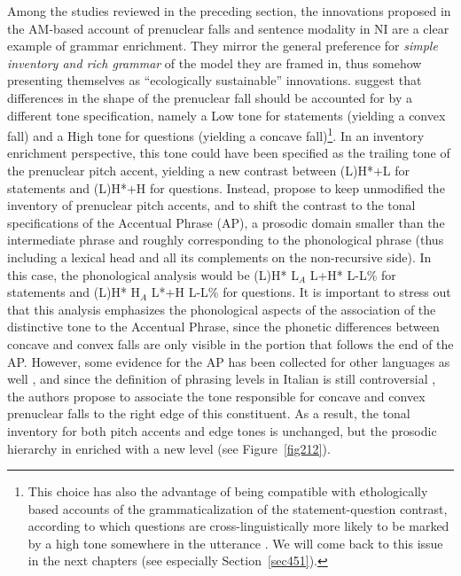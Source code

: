 Among the studies reviewed in the preceding section, the innovations proposed in the AM-based account of prenuclear falls and sentence modality in NI \citep{petrone2008tonal} are a clear example of grammar enrichment. They mirror the general preference for \textit{simple inventory and rich grammar} of the model they are framed in, thus somehow presenting themselves as ``ecologically sustainable'' innovations. \citeauthor{petrone2008tonal} suggest that differences in the shape of the prenuclear fall should be accounted for by a different tone specification, namely a Low tone for statements (yielding a convex fall) and a High tone for questions (yielding a concave fall)\footnote{This choice has also the advantage of being compatible with ethologically based accounts of the grammaticalization of the statement-question contrast, according to which questions are cross-linguistically more likely to be marked by a high tone somewhere in the utterance \citep{ohala1983cross,gussenhoven2004phonology}. We will come back to this issue in the next chapters (see especially Section~\ref{sec451}).}. In an inventory enrichment perspective, this tone could have been specified as the trailing tone of the prenuclear pitch accent, yielding a new contrast between (L)H*+L for statements and (L)H*+H for questions. Instead, \citeauthor{petrone2008tonal} propose to keep unmodified the inventory of prenuclear pitch accents, and to shift the contrast to the tonal specifications of the Accentual Phrase (AP), a prosodic domain smaller than the intermediate phrase and roughly corresponding to the phonological phrase (thus including a lexical head and all its complements on the non-recursive side). In this case, the phonological analysis would be (L)H* L$_{A}$ L+H* L-L\% for statements and (L)H* H$_{A}$ L*+H L-L\% for questions. It is important to stress out that this analysis emphasizes the phonological aspects of the association of the distinctive tone to the Accentual Phrase, since the phonetic differences between concave and convex falls are only visible in the portion that follows the end of the AP. However, some evidence for the AP has been collected for other languages as well \citep{jun1993phonetics,michelas2011caracterisation}, and since the definition of phrasing levels in Italian is still controversial \citep{dimperio2003levels}, the authors propose to associate the tone responsible for concave and convex prenuclear falls to the right edge of this constituent. As a result, the tonal inventory for both pitch accents and edge tones is unchanged, but the prosodic hierarchy in enriched with a new level (see Figure~\ref{fig212}).

